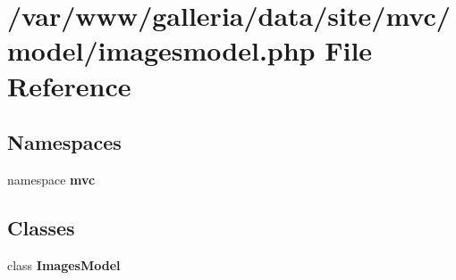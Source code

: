 \section{/var/www/galleria/data/site/mvc/model/imagesmodel.php File Reference}
\label{imagesmodel_8php}
\subsection*{Namespaces}
\begin{CompactItemize}
\item 
namespace {\bf mvc}
\end{CompactItemize}
\subsection*{Classes}
\begin{CompactItemize}
\item 
class {\bf ImagesModel}
\end{CompactItemize}
